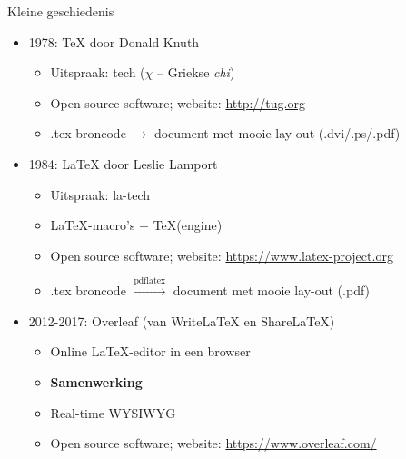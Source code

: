 \documentclass[aspectratio=169]{beamer}
\begin{document}
\begin{frame}{Kleine geschiedenis}
\begin{itemize}
\item 1978: \alert{\TeX} door Donald Knuth
 \begin{itemize}
  \item Uitspraak: tech ($\chi$ -- Griekse \textit{chi})
  \item Open source software; website: \url{http://tug.org}
  \item .tex broncode $\rightarrow$ document met mooie lay-out (.dvi/.ps/.pdf) %
 \end{itemize}\pause
\item 1984: \alert{\LaTeX} door Leslie Lamport
 \begin{itemize}
  \item Uitspraak: la-tech
  \item \LaTeX-macro's + \TeX (engine)%
  \item Open source software; website: \url{https://www.latex-project.org}
  \item .tex broncode $\xrightarrow{\text{pdflatex}}$ document met mooie lay-out (.pdf)
 \end{itemize}\pause
\item 2012-2017: Overleaf (van WriteLaTeX en ShareLaTeX)
 \begin{itemize}
  \item Online \LaTeX-editor in een browser
  \item \textbf{Samenwerking}
  \item Real-time WYSIWYG
  \item Open source software; website: \url{https://www.overleaf.com/}
 \end{itemize}
\end{itemize}

\end{frame}

\end{document}
